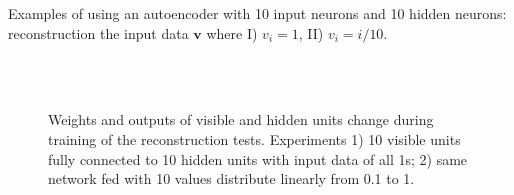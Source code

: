 \documentclass[conference]{IEEEtran}
\begin{document}
	Examples of using an autoencoder with 10 input neurons and 10 hidden neurons: reconstruction the input data $\mathbf{v}$ where I) $v_i = 1$, II) $v_i = i/10$.
	\begin{figure}
		\\
		\\
	\caption{Weights and outputs of visible and hidden units change during training of the reconstruction tests. 
	Experiments 1) 10 visible units fully connected to 10 hidden units with input data of all 1s; 2) same network fed with 10 values distribute linearly from 0.1 to 1.}
	\end{figure}
	
\end{document}

